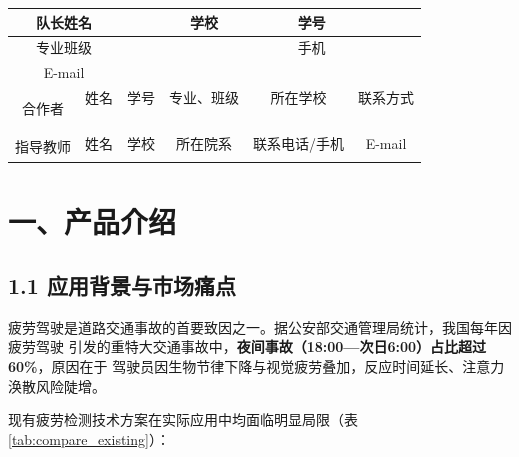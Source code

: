 \documentclass[a4paper,12pt]{article}
\begin{document}
\newpage
\thispagestyle{plain}

\begin{table}[H]
  \centering
  \renewcommand{\arraystretch}{1.6}
  \begin{tabular}{|c|c|c|c|c|c|c|}
    \hline
    \multicolumn{2}{|c|}{队长姓名} & & 学校 & & 学号 & \\
    \hline
    \multicolumn{2}{|c|}{专业班级} & \multicolumn{3}{c|}{} & 手机 & \\
    \hline
    \multicolumn{2}{|c|}{E-mail} & \multicolumn{5}{c|}{}\\
    \hline
    \multirow{5}{*}{合作者}
      & 姓名 & 学号 & 专业、班级 & \multicolumn{2}{c|}{所在学校} & 联系方式\\
    \cline{2-7}
      & & & & \multicolumn{2}{c|}{} & \\
    \cline{2-7}
      & & & & \multicolumn{2}{c|}{} & \\
    \cline{2-7}
      & & & & \multicolumn{2}{c|}{} & \\
    \cline{2-7}
      & & & & \multicolumn{2}{c|}{} & \\
    \hline
    \multirow{2}{*}{指导教师}
      & 姓名 & 学校 & 所在院系 & \multicolumn{2}{c|}{联系电话/手机} & E-mail\\
    \cline{2-7}
      & & & & \multicolumn{2}{c|}{} & \\
    \hline
  \end{tabular}
\end{table}

\vspace{0.8cm}

\section*{一、产品介绍}

\subsection*{1.1 应用背景与市场痛点}

疲劳驾驶是道路交通事故的首要致因之一。据公安部交通管理局统计，我国每年因疲劳驾驶
引发的重特大交通事故中，\textbf{夜间事故（18:00—次日6:00）占比超过60\%}，原因在于
驾驶员因生物节律下降与视觉疲劳叠加，反应时间延长、注意力涣散风险陡增。

现有疲劳检测技术方案在实际应用中均面临明显局限（表\ref{tab:compare_existing}）：
\end{document}
